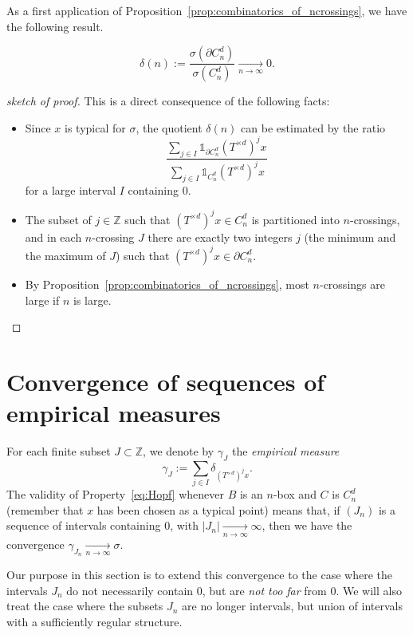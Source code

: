 \documentclass[AHL,Unicode,longabstracts]{cedram}
\newcommand{\egdef}{:=}
\newcommand{\tend}[3][]{\xrightarrow[#2\to#3]{#1}}
\newcommand{\ind}[1]{\mathds{1}_{#1}}
\newcommand{\ZZ}{\mathbb{Z}}
\newcommand{\cd}{C^{d}}
\newcommand{\td}{T^{\times d}}
\begin{document}
As a first application of Proposition~\ref{prop:combinatorics_of_ncrossings}, we have the following result.

\begin{coro}\label{cor:edge}%
\[
\delta(n)\egdef \dfrac{\sigma(\partial \cd_n)}{\sigma(\cd_n)} \tend{n}{\infty} 0.
\]
\end{coro}

\begin{proof}[sketch of proof]
This is a direct consequence of the following facts:
\begin{itemize}
\item Since $x$ is typical for $\sigma$, the quotient $\delta(n)$ can be estimated by the ratio
\[
\dfrac{\sum_{j\in I}\ind{\partial \cd_n} (\td)^j x}{\sum_{j\in I}\ind{\cd_n} (\td)^j x}
\]
for a large interval $I$ containing 0.
\item The subset of $j\in \ZZ$ such that $(\td)^jx\in \cd_n$ is partitioned into $n$-crossings, and in each $n$-crossing $J$ there are exactly two integers $j$ (the minimum and the maximum of $J$) such that $(\td)^jx\in\partial\cd_n$.
\item By Proposition~\ref{prop:combinatorics_of_ncrossings}, most $n$-crossings are large if $n$ is large.\qedhere
\end{itemize}
\end{proof}



\section{Convergence of sequences of empirical measures}\label{sec:convergence}
For each finite subset $J\subset\ZZ$, we denote by $\gamma_J$ the \emph{empirical measure}
\[
\gamma_J \egdef \sum_{j\in I} \delta_{(\td)^j x}.
\]
The validity of Property~\eqref{eq:Hopf} whenever $B$ is an $n$-box and $C$ is $\cd_n$ (remember that $x$ has been chosen as a typical point) means that, if $(J_n)$ is a sequence of intervals containing $0$, with $|J_n|\tend{n}{\infty}\infty$, then we have the convergence $\gamma_{J_n}\tend{n}{\infty} \sigma$.

Our purpose in this section is to extend this convergence to the case where the intervals $J_n$ do not necessarily contain 0, but are \emph{not too far} from 0. We will also treat the case where the subsets $J_n$ are no longer intervals, but union of intervals with a sufficiently regular structure.
\end{document}
